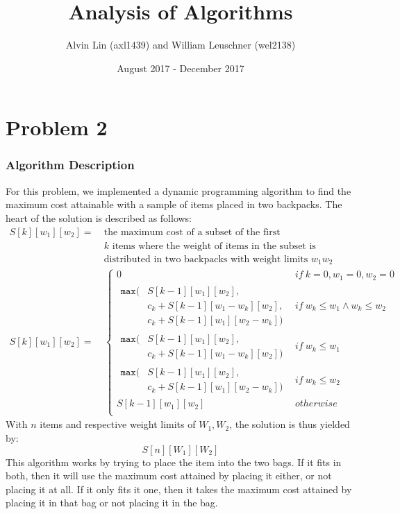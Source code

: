 \documentclass{math}
\title{Analysis of Algorithms}
\author{Alvin Lin (axl1439) and William Leuschner (wel2138)}
\date{August 2017 - December 2017}
\begin{document}
\maketitle

\section*{Problem 2}

\subsubsection*{Algorithm Description}
For this problem, we implemented a dynamic programming algorithm to find the
maximum cost attainable with a sample of items placed in two backpacks. The
heart of the solution is described as follows:
\begin{align*}
  S[k][w_1][w_2] =~& \text{the maximum cost of a subset of the first } \\
  & k \text{ items where the weight of items in the subset is} \\
  & \text{distributed in two backpacks with weight limits } w_1w_2 \\[3em]
  S[k][w_1][w_2] =& \begin{cases}
    0 & if~k = 0, w_1 = 0, w_2 = 0 \\[1em]
    \begin{aligned}
      \texttt{max}(&S[k-1][w_1][w_2], \\
      & c_k+S[k-1][w_1-w_k][w_2], \\
      & c_k+S[k-1][w_1][w_2-w_k])
    \end{aligned} & if~w_k\le w_1\wedge w_k\le w_2 \\[2em]
    \begin{aligned}
      \texttt{max}(&S[k-1][w_1][w_2], \\
      & c_k+S[k-1][w_1-w_k][w_2])
    \end{aligned} & if~w_k\le w_1 \\[2em]
    \begin{aligned}
      \texttt{max}(&S[k-1][w_1][w_2], \\
      & c_k+S[k-1][w_1][w_2-w_k])
    \end{aligned} & if~w_k\le w_2 \\[2em]
    S[k-1][w_1][w_2] & otherwise \\
  \end{cases}
\end{align*}
With \( n \) items and respective weight limits of \( W_1,W_2 \), the solution
is thus yielded by:
\[ S[n][W_1][W_2] \]
This algorithm works by trying to place the item into the two bags. If it fits
in both, then it will use the maximum cost attained by placing it either, or
not placing it at all. If it only fits it one, then it takes the maximum cost
attained by placing it in that bag or not placing it in the bag.
\end{document}
